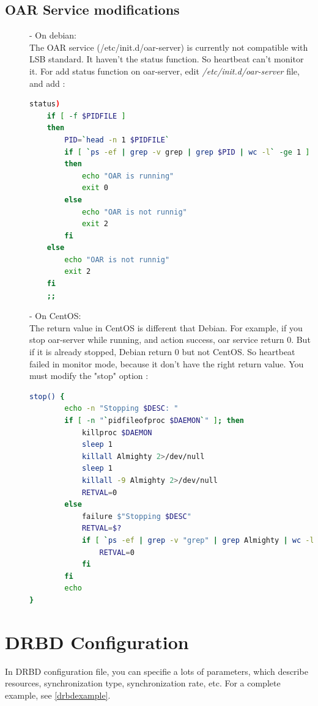 \documentclass[a4paper,10pt]{report}
\begin{document}
\subsection{OAR Service modifications}
\begin{description}
\item[]- On debian:\\

The OAR service (/etc/init.d/oar-server) is currently not compatible with LSB standard. It haven't the status function. So heartbeat can't monitor it.
For add status function on oar-server, edit \textit{/etc/init.d/oar-server} file, and add :
\begin{lstlisting}[language=bash]
status)
	if [ -f $PIDFILE ]
	then
		PID=`head -n 1 $PIDFILE`
		if [ `ps -ef | grep -v grep | grep $PID | wc -l` -ge 1 ]
		then
			echo "OAR is running"
			exit 0
		else
			echo "OAR is not runnig"
			exit 2
		fi
	else
		echo "OAR is not runnig"
		exit 2
	fi
	;;
\end{lstlisting}

\item[]- On CentOS:\\

The return value in CentOS is different that Debian. For example, if you stop oar-server while running, and action success, oar service return 0. But if it is already stopped, Debian return 0 but not CentOS. So heartbeat failed in monitor mode, because it don't have the right return value.
You must modify the "stop" option :
\begin{lstlisting}[language=bash]
stop() {
        echo -n "Stopping $DESC: "
        if [ -n "`pidfileofproc $DAEMON`" ]; then
            killproc $DAEMON
            sleep 1
            killall Almighty 2>/dev/null
            sleep 1
            killall -9 Almighty 2>/dev/null
            RETVAL=0
        else
            failure $"Stopping $DESC"
            RETVAL=$?
            if [ `ps -ef | grep -v "grep" | grep Almighty | wc -l` -eq 0 ]; then
                RETVAL=0
            fi
        fi
        echo 
}
\end{lstlisting}
\end{description}

\section{DRBD Configuration}
In DRBD configuration file, you can specifie a lots of parameters, which describe resources, synchronization type, synchronization rate, etc. For a complete example, see \ref{drbdexample}.
\end{document}
